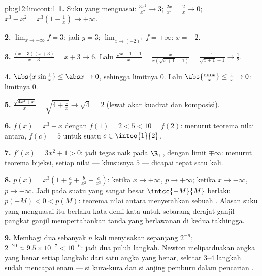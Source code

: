 \begin{solution}{pb:g12:limcont:1}
\textbf{1.} Suku yang menguasai: $\frac{3x^2}{x^2} \to 3$;
$\frac{2x}{x^2} = \frac2x \to 0$;
$x^3 - x^2 = x^3\left(1 - \frac1x\right) \to +\infty$.

\textbf{2.} $\lim_{x \to \pm\infty} f = 3$: jadi  $y = 3$; $\lim_{x \to (-2)^\pm} f = \mp\infty$:
 $x = -2$.

\textbf{3.} $\frac{(x-3)(x+3)}{x - 3} = x + 3 \to 6$. Lalu
$\frac{\sqrt{x+1} - 1}{x} = \frac{x}{x(\sqrt{x+1} + 1)} =
\frac{1}{\sqrt{x+1} + 1} \to \frac12$.

\textbf{4.} $\abs{x \sin\frac1x} \leq \abs x \to 0$, sehingga
limitnya $0$. Lalu
$\abs{\frac{\sin x}{x}} \leq \frac1x \to 0$: limitnya $0$.

\textbf{5.} $\frac{\sqrt{4x^2 + x}}{x} =
\sqrt{4 + \frac1x} \to \sqrt4 = 2$ (lewat  akar
kuadrat dan komposisi).

\textbf{6.} $f(x) = x^3 + x$  dengan
$f(1) = 2 < 5 < 10 = f(2)$: menurut teorema nilai antara, $f(c) = 5$ untuk
suatu $c \in \intoo{1}{2}$.

\textbf{7.} $f'(x) = 3x^2 + 1 > 0$: jadi tegas naik pada
$\R$, , dengan limit $\mp\infty$: menurut teorema bijeksi,
setiap nilai --- khususnya $5$ --- dicapai
tepat satu kali.

\textbf{8.} $p(x) = x^3\left(1 + \frac ax + \frac{b}{x^2} +
\frac{c}{x^3}\right)$: ketika $x \to +\infty$, $p \to +\infty$; ketika
$x \to -\infty$, $p \to -\infty$. Jadi pada suatu  yang sangat besar
$\intcc{-M}{M}$ berlaku $p(-M) < 0 < p(M)$: teorema nilai antara menyerahkan
sebuah . Alasan suku yang menguasai itu berlaku kata demi kata untuk
sebarang derajat ganjil --- pangkat ganjil mempertahankan tanda yang
berlawanan di kedua takhingga.

\textbf{9.} Membagi dua sebanyak $n$ kali menyisakan  sepanjang
$2^{-n}$; $2^{-20} \approx 9.5 \times 10^{-7} < 10^{-6}$:
jadi dua puluh langkah. Newton melipatduakan angka yang benar setiap langkah:
dari satu angka yang benar, sekitar $3$--$4$ langkah sudah mencapai enam ---
si kura-kura dan si anjing pemburu dalam pencarian .


\end{solution}
